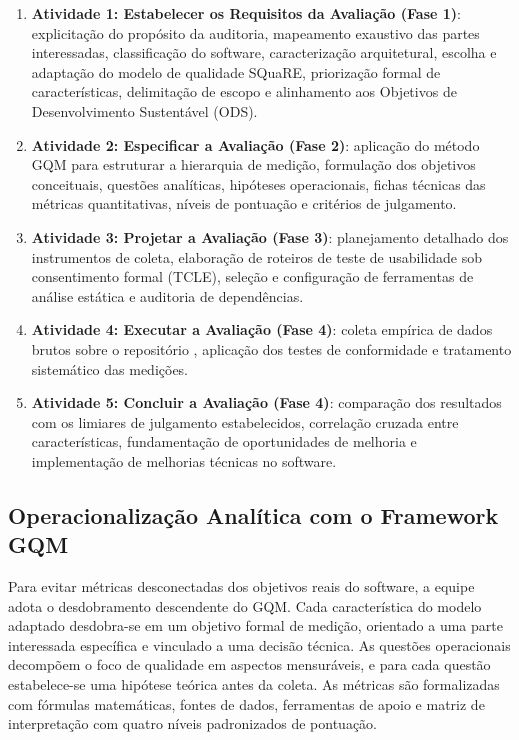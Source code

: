 \documentclass[journal]{IEEEtran}
\begin{document}
\begin{enumerate}
    \item \textbf{Atividade 1: Estabelecer os Requisitos da Avaliação (Fase 1)}: explicitação do propósito da auditoria, mapeamento exaustivo das partes interessadas, classificação do software, caracterização arquitetural, escolha e adaptação do modelo de qualidade SQuaRE, priorização formal de características, delimitação de escopo e alinhamento aos Objetivos de Desenvolvimento Sustentável (ODS).
    \item \textbf{Atividade 2: Especificar a Avaliação (Fase 2)}: aplicação do método GQM para estruturar a hierarquia de medição, formulação dos objetivos conceituais, questões analíticas, hipóteses operacionais, fichas técnicas das métricas quantitativas, níveis de pontuação e critérios de julgamento.
    \item \textbf{Atividade 3: Projetar a Avaliação (Fase 3)}: planejamento detalhado dos instrumentos de coleta, elaboração de roteiros de teste de usabilidade sob consentimento formal (TCLE), seleção e configuração de ferramentas de análise estática e auditoria de dependências.
    \item \textbf{Atividade 4: Executar a Avaliação (Fase 4)}: coleta empírica de dados brutos sobre o repositório , aplicação dos testes de conformidade e tratamento sistemático das medições.
    \item \textbf{Atividade 5: Concluir a Avaliação (Fase 4)}: comparação dos resultados com os limiares de julgamento estabelecidos, correlação cruzada entre características, fundamentação de oportunidades de melhoria e implementação de melhorias técnicas no software.
\end{enumerate}

\subsection{Operacionalização Analítica com o Framework GQM}
\label{sec:metodo_gqm}

Para evitar métricas desconectadas dos objetivos reais do software, a equipe adota o desdobramento descendente do GQM. Cada característica do modelo adaptado desdobra-se em um objetivo formal de medição, orientado a uma parte interessada específica e vinculado a uma decisão técnica. As questões operacionais decompõem o foco de qualidade em aspectos mensuráveis, e para cada questão estabelece-se uma hipótese teórica antes da coleta. As métricas são formalizadas com fórmulas matemáticas, fontes de dados, ferramentas de apoio e matriz de interpretação com quatro níveis padronizados de pontuação.
\end{document}
